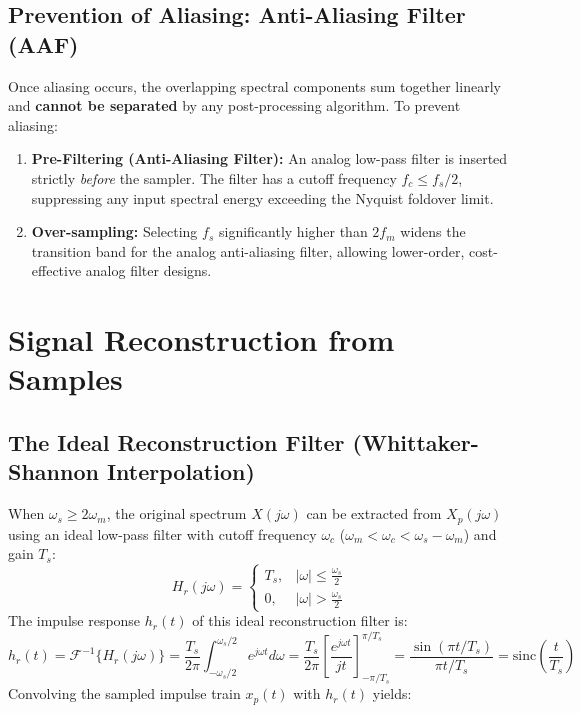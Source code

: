 \documentclass[12pt,a4paper]{article}
\begin{document}
\subsection{Prevention of Aliasing: Anti-Aliasing Filter (AAF)}
Once aliasing occurs, the overlapping spectral components sum together linearly and \textbf{cannot be separated} by any post-processing algorithm. To prevent aliasing:
\begin{enumerate}[topsep=2pt, itemsep=2pt]
  \item \textbf{Pre-Filtering (Anti-Aliasing Filter):} An analog low-pass filter is inserted strictly \textit{before} the sampler. The filter has a cutoff frequency $f_c \le f_s / 2$, suppressing any input spectral energy exceeding the Nyquist foldover limit.
  \item \textbf{Over-sampling:} Selecting $f_s$ significantly higher than $2f_m$ widens the transition band for the analog anti-aliasing filter, allowing lower-order, cost-effective analog filter designs.
\end{enumerate}

\section{Signal Reconstruction from Samples}

\subsection{The Ideal Reconstruction Filter (Whittaker-Shannon Interpolation)}
When $\omega_s \ge 2\omega_m$, the original spectrum $X(j\omega)$ can be extracted from $X_p(j\omega)$ using an ideal low-pass filter with cutoff frequency $\omega_c$ ($\omega_m < \omega_c < \omega_s - \omega_m$) and gain $T_s$:
\begin{equation}
  H_r(j\omega) = \begin{cases} T_s, & |\omega| \le \frac{\omega_s}{2} \\ 0, & |\omega| > \frac{\omega_s}{2} \end{cases}
\end{equation}
The impulse response $h_r(t)$ of this ideal reconstruction filter is:
\begin{equation}
  h_r(t) = \mathcal{F}^{-1}\{H_r(j\omega)\} = \frac{T_s}{2\pi} \int_{-\omega_s/2}^{\omega_s/2} e^{j\omega t} d\omega = \frac{T_s}{2\pi} \left[ \frac{e^{j\omega t}}{jt} \right]_{-\pi/T_s}^{\pi/T_s} = \frac{\sin(\pi t / T_s)}{\pi t / T_s} = \text{sinc}\left(\frac{t}{T_s}\right)
\end{equation}
Convolving the sampled impulse train $x_p(t)$ with $h_r(t)$ yields:
\end{document}
